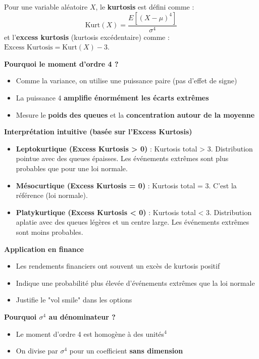 \begin{intuitionbox}
Pour une variable aléatoire $X$, le \textbf{kurtosis} est défini comme :
\[
\text{Kurt}(X) = \frac{E[(X - \mu)^4]}{\sigma^4}
\]
et l'\textbf{excess kurtosis} (kurtosis excédentaire) comme : $\text{Excess Kurtosis} = \text{Kurt}(X) - 3$.

\medskip

\textbf{Pourquoi le moment d'ordre 4 ?}
\begin{itemize}
    \item Comme la variance, on utilise une puissance paire (pas d'effet de signe)
    \item La puissance 4 \textbf{amplifie énormément les écarts extrêmes}
    \item Mesure le \textbf{poids des queues} et la \textbf{concentration autour de la moyenne}
\end{itemize}

\medskip

\textbf{Interprétation intuitive (basée sur l'Excess Kurtosis)}
\begin{itemize}
    \item \textbf{Leptokurtique (Excess Kurtosis > 0)} : Kurtosis total > 3. Distribution pointue avec des queues épaisses. Les événements extrêmes sont plus probables que pour une loi normale.
    \item \textbf{Mésocurtique (Excess Kurtosis = 0)} : Kurtosis total = 3. C'est la référence (loi normale).
    \item \textbf{Platykurtique (Excess Kurtosis < 0)} : Kurtosis total < 3. Distribution aplatie avec des queues légères et un centre large. Les événements extrêmes sont moins probables.
\end{itemize}

\medskip

\textbf{Application en finance}
\begin{itemize}
    \item Les rendements financiers ont souvent un excès de kurtosis positif
    \item Indique une probabilité plus élevée d'événements extrêmes que la loi normale
    \item Justifie le "vol smile" dans les options
\end{itemize}

\medskip

\textbf{Pourquoi $\sigma^4$ au dénominateur ?}
\begin{itemize}
    \item Le moment d'ordre 4 est homogène à des unités$^4$
    \item On divise par $\sigma^4$ pour un coefficient \textbf{sans dimension}
\end{itemize}
\end{intuitionbox}

